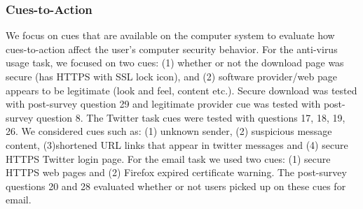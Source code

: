 \subsubsection{Cues-to-Action}
We focus on cues that are available on the computer system to evaluate how cues-to-action affect the user's computer security behavior. For the anti-virus usage task, we focused on two cues: (1) whether or not the download page was secure (has HTTPS with SSL lock icon), and (2) software provider/web page appears to be legitimate (look and feel, content etc.). Secure download was tested with post-survey question 29 and legitimate provider cue was tested with post-survey question 8. The Twitter task cues were tested with questions 17, 18, 19, 26. We considered cues such as: (1) unknown sender, (2) suspicious message content, (3)shortened URL links that appear in twitter messages and (4) secure HTTPS Twitter login page. For the email task we used two cues: (1) secure HTTPS web pages and (2) Firefox expired certificate warning. The post-survey questions 20 and 28 evaluated whether or not users picked up on these cues for email.

